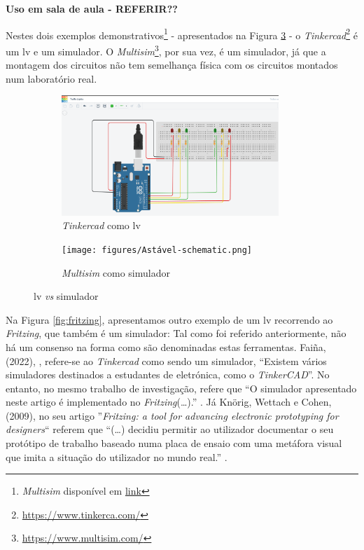 \textbf{Uso em sala de aula - REFERIR??}

Nestes dois exemplos demonstrativos\footnote{\textit{Multisim} disponível em \href{https://www.ni.com/en/support/downloads/software-products/download.multisim.html\#452133}{link}} - apresentados na Figura \ref{fig:tinkercad} - o \textit{Tinkercad}\footnote{\url{https://www.tinkerca.com/}} é um \acrshort{lv} e um simulador. O \textit{Multisim}\footnote{\url{https://www.multisim.com/}}, por sua vez, é um simulador, já que a montagem dos circuitos não tem semelhança física com os circuitos montados num laboratório real. 

\begin{figure}[hbtp]
\centering
\begin{subfigure}[hbtp]{0.48\textwidth}
\centering
    \includegraphics[width=0.9\textwidth]{figures/tinkercad_exemplo.png}
    \caption{\textit{Tinkercad} como \acrshort{lv}}
    \label{fig:tinkercadVL}
\end{subfigure}
\begin{subfigure}[hbtp]{0.48\textwidth}
    \texttt{[image: figures/Astável-schematic.png]}
\caption{\textit{Multisim} como simulador}
\label{fig:tinkercadOS}
\end{subfigure}
\caption{\acrshort{lv} \textit{vs} simulador}
\label{fig:tinkercad}
\end{figure}

Na Figura \ref{fig:fritzing}, apresentamos outro exemplo de um \acrshort{lv} recorrendo ao \textit{Fritzing}, que também é um simulador: Tal como foi referido anteriormente, não há um consenso na forma como são denominadas estas ferramentas. Faiña, (2022), \cite{faina}, refere-se ao \textit{Tinkercad} como sendo um simulador, ``Existem vários simuladores destinados a estudantes de eletrónica, como o \textit{TinkerCAD}''. No entanto, no mesmo trabalho de investigação, refere que ``O simulador apresentado neste artigo é implementado no \textit{Fritzing}(\ldots).'' \cite{faina}. Já Knörig, Wettach e Cohen, (2009), no seu artigo ''\textit{Fritzing: a tool for advancing electronic prototyping for designers}`` referem que ``(\ldots) decidiu permitir ao utilizador documentar o seu protótipo de trabalho baseado numa placa de ensaio com uma metáfora visual que imita a situação do utilizador no mundo real.'' \cite{Knorig2009Feb}.

